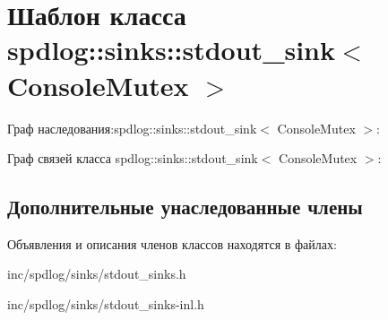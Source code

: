 \hypertarget{classspdlog_1_1sinks_1_1stdout__sink}{}\section{Шаблон класса spdlog\+:\+:sinks\+:\+:stdout\+\_\+sink$<$ Console\+Mutex $>$}
\label{classspdlog_1_1sinks_1_1stdout__sink}


Граф наследования\+:spdlog\+:\+:sinks\+:\+:stdout\+\_\+sink$<$ Console\+Mutex $>$\+:


Граф связей класса spdlog\+:\+:sinks\+:\+:stdout\+\_\+sink$<$ Console\+Mutex $>$\+:
\subsection*{Дополнительные унаследованные члены}


Объявления и описания членов классов находятся в файлах\+:\begin{DoxyCompactItemize}
\item 
inc/spdlog/sinks/stdout\+\_\+sinks.\+h\item 
inc/spdlog/sinks/stdout\+\_\+sinks-\/inl.\+h\end{DoxyCompactItemize}
